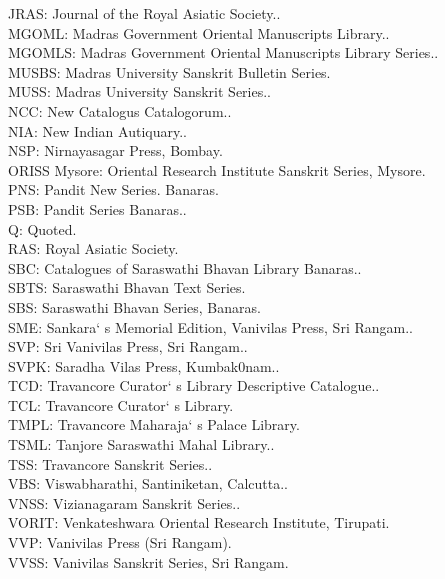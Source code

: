 JRAS: Journal of the Royal Asiatic Society..\\
MGOML: Madras Government Oriental Manuscripts Library..\\
MGOMLS: Madras Government Oriental Manuscripts Library Series..\\
MUSBS: Madras University Sanskrit Bulletin Series.\\
MUSS: Madras University Sanskrit Series..\\
NCC: New Catalogus Catalogorum..\\
NIA: New Indian Autiquary..\\
NSP: Nirnayasagar Press, Bombay.\\
ORISS Mysore: Oriental Research Institute Sanskrit Series, Mysore.\\
PNS: Pandit New Series. Banaras.\\
PSB: Pandit Series Banaras..\\
Q: Quoted.\\
RAS: Royal Asiatic Society.\\
SBC: Catalogues of Saraswathi Bhavan Library Banaras..\\
SBTS: Saraswathi Bhavan Text Series.\\
SBS: Saraswathi Bhavan Series, Banaras.\\
SME: Sankara` s Memorial Edition, Vanivilas Press, Sri Rangam..\\
SVP: Sri Vanivilas Press, Sri Rangam..\\
SVPK: Saradha Vilas Press, Kumbak0nam..\\
TCD: Travancore Curator` s Library Descriptive Catalogue..\\
TCL: Travancore Curator` s Library.\\
TMPL: Travancore Maharaja` s Palace Library.\\
TSML: Tanjore Saraswathi Mahal Library..\\
TSS: Travancore Sanskrit Series..\\
VBS: Viswabharathi, Santiniketan, Calcutta..\\
VNSS: Vizianagaram Sanskrit Series..\\
VORIT: Venkateshwara Oriental Research Institute, Tirupati.\\
VVP: Vanivilas Press (Sri Rangam).\\
VVSS: Vanivilas Sanskrit Series, Sri Rangam.
